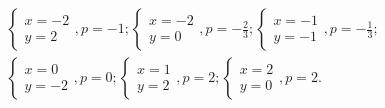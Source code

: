 \documentclass[10pt]{article}
\begin{document}
$$
\begin{gathered}
\left\{\begin{array}{l}
x=-2 \\
y=2
\end{array}, p=-1 ;\left\{\begin{array}{l}
x=-2 \\
y=0
\end{array}, p=-\frac{2}{3} ;\left\{\begin{array}{l}
x=-1 \\
y=-1
\end{array}, p=-\frac{1}{3} ;\right.\right.\right. \\
\left\{\begin{array}{l}
x=0 \\
y=-2
\end{array}, p=0 ;\left\{\begin{array}{l}
x=1 \\
y=2
\end{array}, p=2 ;\left\{\begin{array}{l}
x=2 \\
y=0
\end{array}, p=2 .\right.\right.\right.
\end{gathered}
$$
\end{document}
